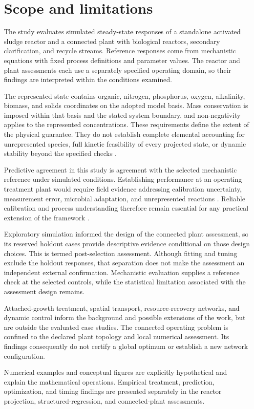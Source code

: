 \section{Scope and limitations}

The study evaluates simulated steady-state responses of a standalone activated sludge reactor and a connected plant with biological reactors, secondary clarification, and recycle streams. Reference responses come from mechanistic equations with fixed process definitions and parameter values. The reactor and plant assessments each use a separately specified operating domain, so their findings are interpreted within the conditions examined.

The represented state contains organic, nitrogen, phosphorus, oxygen, alkalinity, biomass, and solids coordinates on the adopted model basis. Mass conservation is imposed within that basis and the stated system boundary, and non-negativity applies to the represented concentrations. These requirements define the extent of the physical guarantee. They do not establish complete elemental accounting for unrepresented species, full kinetic feasibility of every projected state, or dynamic stability beyond the specified checks \citep{TakacsVanrolleghem2006,Selerio2026}.

Predictive agreement in this study is agreement with the selected mechanistic reference under simulated conditions. Establishing performance at an operating treatment plant would require field evidence addressing calibration uncertainty, measurement error, microbial adaptation, and unrepresented reactions \citep{Machado2014,Newhart2019}. Reliable calibration and process understanding therefore remain essential for any practical extension of the framework \citep{Petersen2003,Meijer2004}.

Exploratory simulation informed the design of the connected plant assessment, so its reserved holdout cases provide descriptive evidence conditional on those design choices. This is termed post-selection assessment. Although fitting and tuning exclude the holdout responses, that separation does not make the assessment an independent external confirmation. Mechanistic evaluation supplies a reference check at the selected controls, while the statistical limitation associated with the assessment design remains.

Attached-growth treatment, spatial transport, resource-recovery networks, and dynamic control inform the background and possible extensions of the work, but are outside the evaluated case studies. The connected operating problem is confined to the declared plant topology and local numerical assessment. Its findings consequently do not certify a global optimum or establish a new network configuration.

Numerical examples and conceptual figures are explicitly hypothetical and explain the mathematical operations. Empirical treatment, prediction, optimization, and timing findings are presented separately in the reactor projection, structured-regression, and connected-plant assessments.